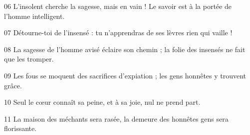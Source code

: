 
06 L’insolent cherche la sagesse, mais en vain ! Le savoir est à la portée de l’homme intelligent.

07 Détourne-toi de l’insensé : tu n’apprendras de ses lèvres rien qui vaille !

08 La sagesse de l’homme avisé éclaire son chemin ; la folie des insensés ne fait que les tromper.

09 Les fous se moquent des sacrifices d’expiation ; les gens honnêtes y trouvent grâce.

10 Seul le cœur connaît sa peine, et à sa joie, nul ne prend part.

11 La maison des méchants sera rasée, la demeure des honnêtes gens sera florissante.
